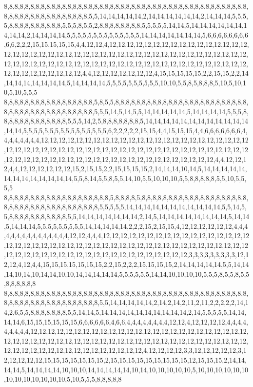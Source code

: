 8,8,8,8,8,8,8,8,8,8,8,8,8,8,8,8,8,8,8,8,8,8,8,8,8,8,8,8,8,8,8,8,8,8,8,8,8,8,8,8,8,8,8,8,8,8,8,8,8,8,8,8,8,8,8,8,8,8,8,8,8,8,5,5,14,14,14,14,14,2,14,14,14,14,14,14,2,14,14,14,5,5,5,5,8,8,8,8,8,8,8,8,8,8,5,5,5,8,5,5,2,8,8,8,8,8,8,8,8,5,5,5,5,5,14,14,5,14,14,14,14,14,14,14,14,14,2,14,14,14,14,5,5,5,5,5,5,5,5,5,5,5,5,5,5,14,14,14,14,14,14,14,5,6,6,6,6,6,6,6,6,6,6,2,2,2,15,15,15,15,15,4,4,12,12,4,12,12,12,12,12,12,12,12,12,12,12,12,12,12,12,12,12,12,12,12,12,12,12,12,12,12,12,12,12,12,12,12,12,12,12,12,12,12,12,12,12,12,12,12,12,12,12,12,12,12,12,12,12,12,12,12,12,12,12,12,12,12,12,12,12,12,12,12,12,12,12,12,12,12,12,12,12,12,12,12,12,4,4,12,12,12,12,12,12,12,4,15,15,15,15,15,2,2,15,15,2,2,14,14,14,14,14,14,14,14,5,14,14,14,14,5,5,5,5,5,5,5,5,5,5,10,10,5,5,8,5,8,8,8,5,10,5,10,10,5,10,5,5,5
8,8,8,8,8,8,8,8,8,8,8,8,8,8,8,8,8,5,8,5,5,8,8,8,8,8,8,8,8,8,8,8,8,8,8,8,8,8,8,8,8,8,8,8,8,8,8,8,8,8,8,8,8,8,8,8,8,8,8,8,8,8,8,5,5,5,14,5,14,5,5,14,14,14,14,14,5,14,14,14,14,5,5,5,8,8,8,8,8,8,8,8,8,8,8,8,8,5,5,5,14,2,5,8,8,8,8,8,8,8,5,14,14,14,14,14,14,14,14,14,14,14,14,14,14,5,5,5,5,5,5,5,5,5,5,5,5,5,5,5,5,6,2,2,2,2,2,15,15,4,4,15,15,15,4,4,6,6,6,6,6,6,6,4,4,4,4,4,4,4,4,12,12,12,12,12,12,12,12,12,12,12,12,12,12,12,12,12,12,12,12,12,12,12,12,12,12,12,12,12,12,12,12,12,12,12,12,12,12,12,12,12,12,12,12,12,12,12,12,12,12,12,12,12,12,12,12,12,12,12,12,12,12,12,12,12,12,12,12,12,12,12,12,12,12,12,12,4,4,12,12,12,4,4,12,12,12,12,12,12,15,2,15,15,2,2,15,15,15,15,2,14,14,14,10,14,5,14,14,14,14,14,14,14,14,14,14,14,14,14,5,5,8,14,5,5,8,5,5,14,10,5,5,10,10,10,5,5,8,8,8,8,8,5,5,10,5,5,5,5
8,8,8,8,8,8,8,8,8,8,8,8,8,8,8,8,8,8,8,8,5,8,8,8,8,5,8,8,8,8,8,8,8,8,8,8,8,8,8,8,8,8,8,8,8,8,8,8,8,8,8,8,8,8,8,8,8,8,8,8,8,8,8,8,5,5,5,5,5,14,14,14,14,14,14,14,14,14,14,14,5,5,14,5,5,8,8,8,8,8,8,8,8,8,8,8,5,5,14,14,14,14,14,14,14,2,14,5,14,14,14,14,14,14,14,14,5,14,14,5,14,14,14,5,5,5,5,5,5,5,5,5,14,14,14,14,14,2,2,2,15,2,15,15,4,12,12,12,12,12,12,4,4,4,4,4,4,4,4,4,4,4,4,4,4,4,12,12,4,4,4,12,12,12,12,12,12,12,12,12,12,12,12,12,12,12,12,12,12,12,12,12,12,12,12,12,12,12,12,12,12,12,12,12,12,12,12,12,12,12,12,12,12,12,12,12,12,12,12,12,12,12,12,12,12,12,12,12,12,12,12,12,12,12,12,12,12,3,3,3,3,3,3,3,3,3,12,12,12,4,12,4,4,15,15,15,15,15,15,15,2,2,15,2,2,2,15,15,15,15,2,14,14,14,14,14,5,5,14,14,14,10,14,10,14,14,10,10,14,14,14,14,14,5,5,5,5,5,5,14,14,10,10,10,10,5,5,5,8,5,5,8,5,5,8,8,8,8,8,8
8,8,8,8,8,8,8,8,8,8,8,8,8,8,8,8,8,8,8,8,8,8,8,8,8,8,8,8,8,8,8,8,8,8,8,8,8,8,8,8,8,8,8,8,8,8,8,8,8,8,8,8,8,8,8,8,8,8,8,8,8,8,8,8,5,5,14,14,14,14,14,2,14,2,14,2,11,2,11,2,2,2,2,2,14,14,2,6,5,5,8,8,8,8,8,8,8,5,5,14,14,5,14,14,14,14,14,14,14,14,14,14,2,14,5,5,5,5,5,14,14,14,14,6,15,15,15,15,15,15,6,6,6,6,6,6,4,6,6,4,4,4,4,4,4,4,4,12,12,4,12,12,12,12,4,4,4,4,4,4,4,4,4,12,12,12,12,12,12,12,12,12,12,12,12,12,12,12,12,12,12,12,12,12,12,12,12,12,12,12,12,12,12,12,12,12,12,12,12,12,12,12,12,12,12,12,12,12,12,12,12,12,12,12,12,12,12,12,12,12,12,12,12,12,12,12,12,12,12,12,12,12,4,12,12,12,12,3,3,12,12,12,12,12,3,12,12,12,12,12,15,15,15,15,15,15,15,2,15,15,15,15,15,15,15,15,15,12,15,15,15,2,14,14,14,14,5,14,14,14,14,10,10,10,14,14,14,14,14,10,14,10,10,10,10,10,5,10,10,10,10,10,10,10,10,10,10,10,10,10,5,10,5,5,5,8,8,8,8,8
